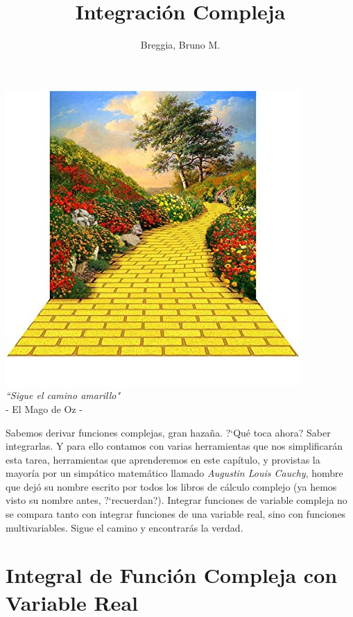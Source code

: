 \documentclass[12pt]{article}
\theoremstyle{definition}
\theoremstyle{theorem}
\theoremstyle{corolary}
\begin{document}
	\title{Integraci\'on Compleja}
	\author{Breggia, Bruno M.}
	\date{}
	\maketitle

\begin{center}
	\includegraphics[scale=0.7]{camino_amarillo.jpg}\\
	\textit{``Sigue el camino amarillo"}\\ - El Mago de Oz -
\end{center}

Sabemos derivar funciones complejas, gran haza\~na. ?`Qu\'e toca ahora? Saber integrarlas. Y para ello contamos con varias herramientas que nos simplificar\'an esta tarea, herramientas que aprenderemos en este cap\'itulo, y provistas la mayor\'ia por un simp\'atico matem\'atico llamado \textit{Augustin Louis Cauchy}, hombre que dej\'o su nombre escrito por todos los libros de c\'alculo complejo (ya hemos visto su nombre antes, ?`recuerdan?). Integrar funciones de variable compleja no se compara tanto con integrar funciones de una variable real, sino con funciones multivariables. Sigue el camino y encontrar\'as la verdad.

\pagebreak
\tableofcontents
\pagebreak

\section{Integral de Funci\'on Compleja con Variable Real}
\end{document}
